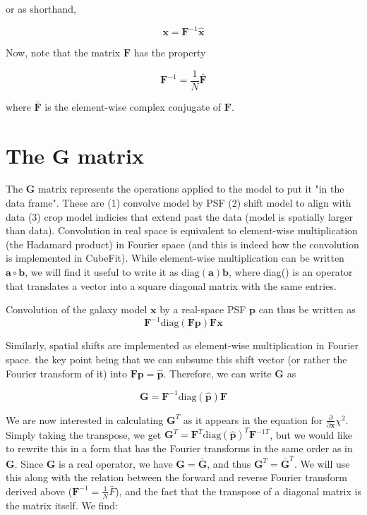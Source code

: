 \documentclass[12pt]{article}
\newcommand{\G}{\mathbf{G}}
\newcommand{\p}{\mathbf{p}}
\newcommand{\phat}{\mathbf{\hat p}}
\newcommand{\x}{\mathbf{x}}
\newcommand{\xhat}{\mathbf{\hat x}}
\newcommand{\F}{\mathbf{F}}
\newcommand{\diag}{\mathrm{diag}}
\newcommand{\ddx}{\frac{\partial}{\partial \mathbf{x}}}
\begin{document}
\noindent or as shorthand,

\begin{equation}
\x = \F^{-1} \xhat
\end{equation}

\noindent Now, note that the matrix $\F$ has the property

\begin{equation}
\F^{-1} = \frac{1}{N} \bar{\F}
\end{equation}

\noindent where $\bar{\F}$ is the element-wise complex conjugate of $\F$.


\section{The $\G$ matrix }

The $\G$ matrix represents the operations applied to the model to put
it "in the data frame". These are (1) convolve model by PSF (2) shift
model to align with data (3) crop model indicies that extend past the
data (model is spatially larger than data). Convolution in real space
is equivalent to element-wise multiplication (the Hadamard product) in
Fourier space (and this is indeed how the convolution is implemented
in CubeFit). While element-wise multiplication can be written
$\mathbf{a} \circ \mathbf{b}$, we will find it useful to write it as
$\diag(\mathbf{a}) \mathbf{b}$, where diag() is an operator
that translates a vector into a square diagonal matrix with the same
entries.

Convolution of the galaxy model $\x$ by a real-space PSF $\p$ can thus be
written as
\begin{equation}
\F^{-1} \diag(\F \p) \F \x
\end{equation}

Similarly, spatial shifts are implemented as element-wise multiplication in
Fourier space. the key point being that we can
subsume this shift vector (or rather the Fourier transform of it) into
$\F \p = \phat$. Therefore, we can write $\G$ as

\begin{equation}
\G = \F^{-1} \diag(\phat) \F
\end{equation}

We are now interested in calculating $\G^T$ as it appears in the
equation for $\ddx \chi^{2}$. Simply taking the transpose, we get
$\G^{T} = \F^T \diag(\phat)^{T} \F^{-1T}$, but we would like
to rewrite this in a form that has the Fourier transforms in the same
order as in $\G$. Since $\G$ is a real operator, we have $\G =
\bar{\G}$, and thus $\G^T = \bar{\G}^T$. We will use this along with
the relation between the forward and reverse Fourier transform derived
above ($\F^{-1} = \frac{1}{N} \bar{F}$), and the fact that the
transpose of a diagonal matrix is the matrix itself. We find:
\end{document}
